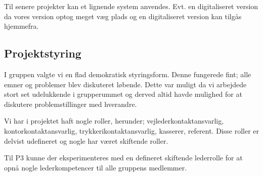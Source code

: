 Til senere projekter kan et lignende system anvendes. Evt. en digitaliseret version da vores version optog meget v\ae{}g plads og en digitaliseret version kan tilg\aa{}s hjemmefra. 

\subsection{Projektstyring}
I gruppen valgte vi en flad demokratisk styringsform. Denne fungerede fint; alle emner og problemer blev diskuteret l\o{}bende. Dette var muligt da vi arbejdede stort set udelukkende i grupperummet og derved altid havde mulighed for at diskutere problemstillinger med hverandre. 

Vi har i projektet haft nogle roller, herunder; vejlederkontaktansvarlig, kontorkontaktansvarlig, trykkerikontaktansvarlig, kasserer, referent. Disse roller er delvist udefineret og nogle har v\ae{}ret skiftende roller.

Til P3 kunne der eksperimenteres med en defineret skiftende lederrolle for at opn\aa{} nogle lederkompetencer til alle gruppens medlemmer. 






